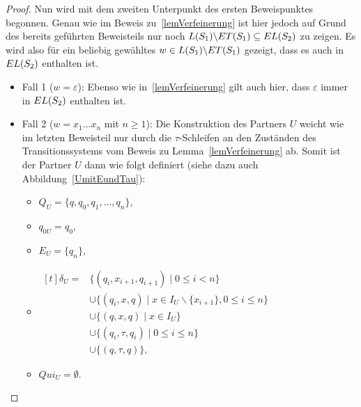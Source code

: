 \begin{proof}
  Nun wird mit dem zweiten Unterpunkt des ersten Beweispunktes begonnen. Genau
  wie im Beweis zu~\ref{lemVerfeinerung} ist hier jedoch auf Grund des bereits
  geführten Beweisteils nur noch $L(S_1)\backslash ET{}(S_1)\subseteq
  EL{}(S_2)$ zu zeigen. Es wird also für ein beliebig gewähltes $w\in
  L(S_1)\backslash ET{}(S_1)$ gezeigt, dass es auch in $EL{}(S_2)$ enthalten
  ist.
  \begin{itemize}
    \item Fall 1 ($w=\varepsilon$): Ebenso wie in~\ref{lemVerfeinerung} gilt
      auch hier, dass $\varepsilon$ immer in $EL{}(S_2)$ enthalten ist.
    \item Fall 2 ($w=x_1\dots x_n$ mit $n\geq 1$): Die Konstruktion des
      Partners $U$ weicht wie im letzten Beweisteil nur durch die
      $\tau$-Schleifen an den Zuständen des Transitionssystems vom Beweis zu
      Lemma~\ref{lemVerfeinerung} ab. Somit ist der Partner $U$ dann wie folgt
      definiert (siehe dazu auch Abbildung~\ref{UmitEundTau}):
      \begin{itemize}
        \item $Q_U=\{q,q_0,q_1,\dots ,q_n\}$,
        \item $q_{0U}=q_0$,
        \item $E_U=\{q_n\}$,
        \item $\begin{aligned}[t]
            \delta _U=&\{(q_i,x_{i+1},q_{i+1})\mid 0\leq i< n\}\\
                      &\cup\{(q_i,x,q)\mid x\in I_U\backslash\{x_{i+1}\},0\leq
          i\leq n\}\\
          &\cup\{(q,x,q)\mid x\in I_U\}\\
          &\cup\{(q_i,\tau ,q_i)\mid 0\leq i\leq n\}\\
          &\cup\{(q,\tau ,q)\},
              \end{aligned}$
        \item $Qui_U =\emptyset$.
      \end{itemize}
      \begin{figure} [h!tbp]
      \begin{center}
\end{center}
\end{figure}
\end{itemize}
\end{proof}

